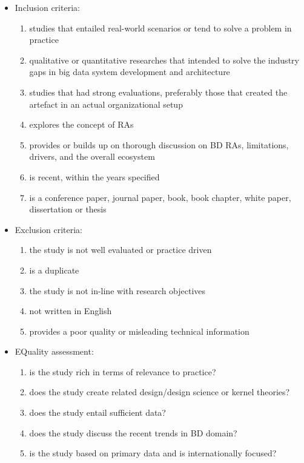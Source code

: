\documentclass[review]{elsarticle}
\begin{document}
\begin{enumerate}
    \begin{itemize}
        \item Inclusion criteria:
        \begin{enumerate}
            \item studies that entailed real-world scenarios or tend to solve a problem in practice
            \item qualitative or quantitative researches that intended to solve the industry gaps in big data system development and architecture
            \item studies that had strong evaluations, preferably those that created the artefact in an actual organizational setup
            \item explores the concept of RAs
            \item provides or builds up on thorough discussion on BD RAs, limitations, drivers, and the overall ecosystem
            \item is recent, within the years specified
            \item is a conference paper, journal paper, book, book chapter, white paper, dissertation or thesis
        \end{enumerate}
        \item Exclusion criteria:
        \begin{enumerate}
            \item the study is not well evaluated or practice driven
            \item is a duplicate
            \item the study is not in-line with research objectives
            \item not written in English
            \item provides a poor quality or misleading technical information
        \end{enumerate}
        \item EQuality assessment:
        \begin{enumerate}
            \item is the study rich in terms of relevance to practice?
            \item does the study create related design/design science or kernel theories?
            \item does the study entail sufficient data? 
            \item does the study discuss the recent trends in BD domain?
            \item is the study based on primary data and is internationally focused?
        \end{enumerate}
    \end{itemize}
\end{enumerate}
\end{document}
